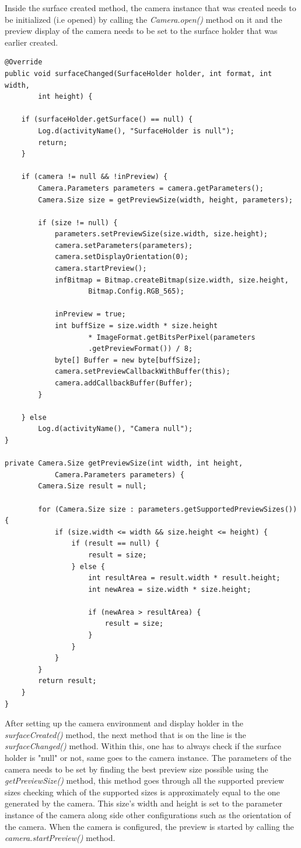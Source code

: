 Inside the surface created method, the camera instance that was created needs to be initialized (i.e opened) by calling the {\it Camera.open()} method on it and the preview display of the camera needs to be set to the surface holder that was earlier created.
\begin{lstlisting}[label=surface-changed,caption=Implementation of surfaceChanged method] 
@Override
public void surfaceChanged(SurfaceHolder holder, int format, int width,
		int height) {

	if (surfaceHolder.getSurface() == null) {
		Log.d(activityName(), "SurfaceHolder is null");
		return;
	}

	if (camera != null && !inPreview) {
		Camera.Parameters parameters = camera.getParameters();
		Camera.Size size = getPreviewSize(width, height, parameters);

		if (size != null) {
			parameters.setPreviewSize(size.width, size.height);
			camera.setParameters(parameters);
			camera.setDisplayOrientation(0);
			camera.startPreview();
			infBitmap = Bitmap.createBitmap(size.width, size.height,
					Bitmap.Config.RGB_565);
				
			inPreview = true;
			int buffSize = size.width * size.height
					* ImageFormat.getBitsPerPixel(parameters
					.getPreviewFormat()) / 8;
			byte[] Buffer = new byte[buffSize];
			camera.setPreviewCallbackWithBuffer(this);
			camera.addCallbackBuffer(Buffer);
		}

	} else
		Log.d(activityName(), "Camera null");
}  

private Camera.Size getPreviewSize(int width, int height,
			Camera.Parameters parameters) {
		Camera.Size result = null;

		for (Camera.Size size : parameters.getSupportedPreviewSizes()) {
			if (size.width <= width && size.height <= height) {
				if (result == null) {
					result = size;
				} else {
					int resultArea = result.width * result.height;
					int newArea = size.width * size.height;

					if (newArea > resultArea) {
						result = size;
					}
				}
			}
		}
		return result;
	} 
}
\end{lstlisting}	

After setting up the camera environment and display holder in the {\it surfaceCreated()} method, the next method that is on the line is the {\it surfaceChanged()} method. Within this, one has to always check if the surface holder is "null" or not, same goes to the camera instance. The parameters of the camera needs to be set by finding the best preview size possible using the {\it getPreviewSize()} method, this method goes through all the supported preview sizes checking which of the supported sizes is approximately equal to the one generated by the camera. This size's width and height is set to the parameter instance of the camera along side other configurations such as the orientation of the camera. When the camera is configured, the preview is started by calling the {\it camera.startPreview()} method. 

